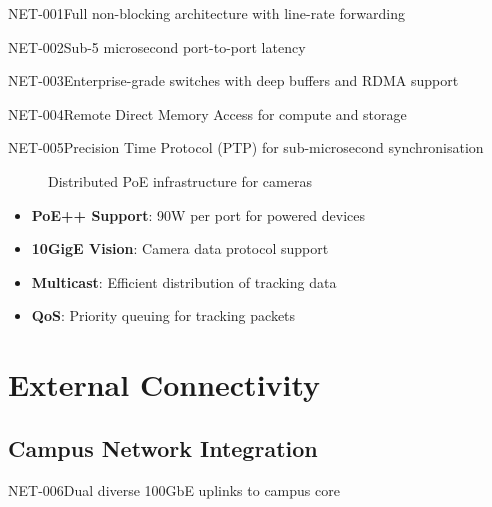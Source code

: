 \begin{requirement}{NET-001}{Full non-blocking architecture with line-rate forwarding}
\begin{requirement}{NET-002}{Sub-5 microsecond port-to-port latency}
\begin{requirement}{NET-003}{Enterprise-grade switches with deep buffers and RDMA support}
\begin{requirement}{NET-004}{Remote Direct Memory Access for compute and storage}
\begin{requirement}{NET-005}{Precision Time Protocol (PTP) for sub-microsecond synchronisation}
\begin{figure}[H]
\caption{Distributed PoE infrastructure for cameras}
\end{figure}

\begin{itemize}
    \item \textbf{PoE++ Support}: 90W per port for powered devices
    \item \textbf{10GigE Vision}: Camera data protocol support
    \item \textbf{Multicast}: Efficient distribution of tracking data
    \item \textbf{QoS}: Priority queuing for tracking packets
\end{itemize}

\section{External Connectivity}

\subsection{Campus Network Integration}

\begin{requirement}{NET-006}{Dual diverse 100GbE uplinks to campus core}


\end{requirement}
\end{requirement}
\end{requirement}
\end{requirement}
\end{requirement}
\end{requirement}
